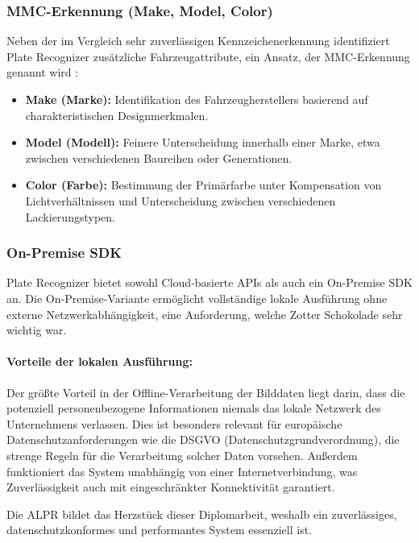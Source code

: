 \subsubsection{MMC-Erkennung (Make, Model, Color)}
\label{sec:mmc}
Neben der im Vergleich sehr zuverlässigen Kennzeichenerkennung identifiziert Plate Recognizer zusätzliche Fahrzeugattribute, ein Ansatz, der MMC-Erkennung genannt wird \cite{platerecognizer_mmc}:
\begin{itemize}
    \item \textbf{Make (Marke):} Identifikation des Fahrzeugherstellers basierend auf charakteristischen Designmerkmalen.
    \item \textbf{Model (Modell):} Feinere Unterscheidung innerhalb einer Marke, etwa zwischen verschiedenen Baureihen oder Generationen.
    \item \textbf{Color (Farbe):} Bestimmung der Primärfarbe unter Kompensation von Lichtverhältnissen und Unterscheidung zwischen verschiedenen Lackierungstypen.
\end{itemize}

\subsubsection{On-Premise SDK}
\label{sec:on_premise}
Plate Recognizer bietet sowohl Cloud-basierte APIs als auch ein On-Premise SDK an.
Die On-Premise-Variante ermöglicht vollständige lokale Ausführung ohne externe Netzwerkabhängigkeit, eine Anforderung, welche Zotter Schokolade sehr wichtig war. \cite{platerecognizer_snapshot}

\paragraph{Vorteile der lokalen Ausführung:}
Der größte Vorteil in der Offline-Verarbeitung der Bilddaten liegt darin, dass die potenziell personenbezogene Informationen niemals das lokale Netzwerk des Unternehmens verlassen.
Dies ist besonders relevant für europäische Datenschutzanforderungen wie die DSGVO (Datenschutzgrundverordnung), die strenge Regeln für die Verarbeitung solcher Daten vorsehen.
Außerdem funktioniert das System unabhängig von einer Internetverbindung, was Zuverlässigkeit auch mit eingeschränkter Konnektivität garantiert.

Die ALPR bildet das Herzstück dieser Diplomarbeit, weshalb ein zuverlässiges, datenschutzkonformes und performantes System essenziell ist.
